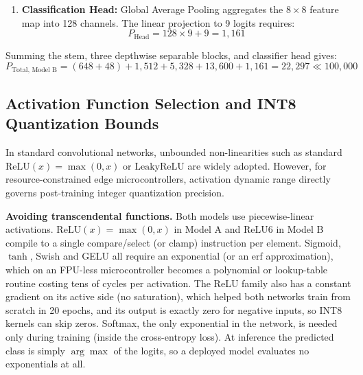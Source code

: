 \documentclass[11pt,a4paper]{article}
\begin{document}
\begin{enumerate}[leftmargin=*,itemsep=2pt]
  \item \textbf{Classification Head:} Global Average Pooling aggregates the $8 \times 8$ feature map into 128 channels. The linear projection to 9 logits requires:
  \begin{equation}
    P_{\text{Head}} = 128 \times 9 + 9 = 1,161
  \end{equation}
\end{enumerate}
Summing the stem, three depthwise separable blocks, and classifier head gives:
\begin{equation}
  P_{\text{Total, Model B}} = (648 + 48) + 1,512 + 5,328 + 13,600 + 1,161 = 22,297 \ll 100,000
\end{equation}


\subsection{Activation Function Selection and INT8 Quantization Bounds}
In standard convolutional networks, unbounded non-linearities such as standard $\text{ReLU}(x) = \max(0, x)$ or $\text{LeakyReLU}$ are widely adopted. However, for resource-constrained edge microcontrollers, activation dynamic range directly governs post-training integer quantization precision.

\textbf{Avoiding transcendental functions.} Both models use piecewise-linear activations. $\text{ReLU}(x) = \max(0, x)$ in Model A and $\text{ReLU6}$ in Model B compile to a single compare/select (or clamp) instruction per element. Sigmoid, $\tanh$, Swish and GELU all require an exponential (or an erf approximation), which on an FPU-less microcontroller becomes a polynomial or lookup-table routine costing tens of cycles per activation. The ReLU family also has a constant gradient on its active side (no saturation), which helped both networks train from scratch in 20 epochs, and its output is exactly zero for negative inputs, so INT8 kernels can skip zeros. Softmax, the only exponential in the network, is needed only during training (inside the cross-entropy loss). At inference the predicted class is simply $\arg\max$ of the logits, so a deployed model evaluates no exponentials at all.
\end{document}
